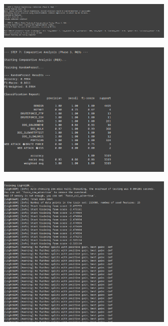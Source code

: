  \begin{figure}[H]
     \centering
     \includegraphics[width=0.75\textwidth]{assets/figures/outputs/4.png}
 \end{figure}
 
 \begin{figure}[H]
     \centering
     \includegraphics[width=0.75\textwidth]{assets/figures/outputs/5.png}
 \end{figure}
 
 \begin{figure}[H]
     \centering
     \includegraphics[width=0.75\textwidth]{assets/figures/outputs/6.png}
 \end{figure}
 
